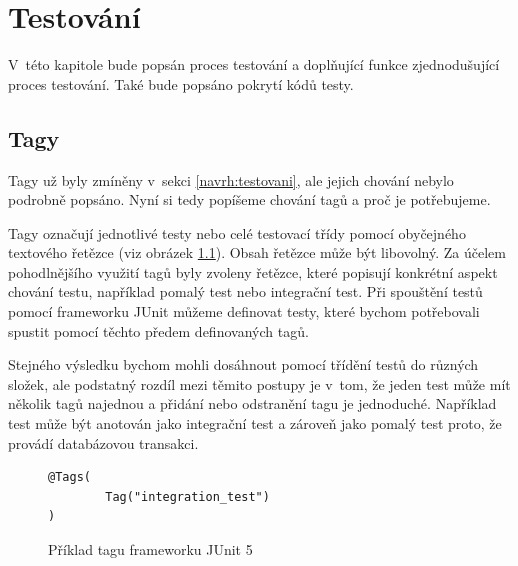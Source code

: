 \chapter{Testování}\label{chapter:testovani}
V~této kapitole bude popsán proces testování a doplňující funkce zjednodušující proces testování. Také bude popsáno pokrytí kódů testy.

\section{Tagy}\label{testovani:tagy}
    Tagy už byly zmíněny v~sekci \ref{navrh:testovani}, ale jejich chování nebylo podrobně popsáno. Nyní si tedy popíšeme chování tagů a proč je potřebujeme. 
    
    Tagy označují jednotlivé testy nebo celé testovací třídy pomocí obyčejného textového řetězce (viz obrázek \ref{code:tag-junit-5}). Obsah řetězce může být libovolný. Za účelem pohodlnějšího využití tagů byly zvoleny řetězce, které popisují konkrétní aspekt chování testu, například pomalý test nebo integrační test. Při spouštění testů pomocí frameworku JUnit můžeme definovat testy, které bychom potřebovali spustit pomocí těchto předem definovaných tagů.
    
    Stejného výsledku bychom mohli dosáhnout pomocí třídění testů do různých složek, ale podstatný rozdíl mezi těmito postupy je v~tom, že jeden test může mít několik tagů najednou a přidání nebo odstranění tagu je jednoduché. Například test může být anotován jako integrační test a zároveň jako pomalý test proto, že provádí databázovou transakci.
    \begin{figure}
        \begin{verbatim}
@Tags(
        Tag("integration_test")
)
        \end{verbatim}
        \caption{Příklad tagu frameworku JUnit 5} 
        \label{code:tag-junit-5}
    \end{figure}
    

